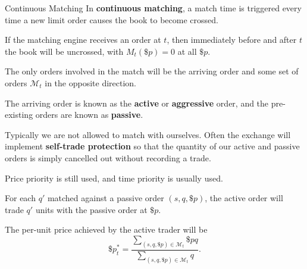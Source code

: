 \documentclass{beamer}
\begin{document}
\begin{frame}{Continuous Matching}
	In \textbf{continuous matching}, a match time is triggered every time a new limit order causes the book to become crossed.

	\pause

	If the matching engine receives an order at $t$, then immediately before and after $t$ the book will be uncrossed, with $M_t(\$p)=0$ at all $\$p$.

	\pause

	The only orders involved in the match will be the arriving order and some set of orders $\mathcal{M}_t$ in the opposite direction.

	The arriving order is known as the \textbf{active} or \textbf{aggressive} order, and the pre-existing orders are known as \textbf{passive}.%

	Typically we are not allowed to match with ourselves. Often the exchange will implement \textbf{self-trade protection} so that the quantity of our active and passive orders is simply cancelled out without recording a trade.

	Price priority is still used, and time priority is usually used.


	\pause

	For each $q'$ matched against a passive order $(s,q,\$p)$, the active order will trade $q'$ units with the passive order at $\$p$. %

	\pause

	The per-unit price achieved by the active trader will be
	$$\$p^*_t = \frac{\sum_{(s,q,\$p)\in\mathcal{M}_t} \$pq}{\sum_{(s,q,\$p)\in\mathcal{M}_t} q}.$$ %



\end{frame}
\end{document}
